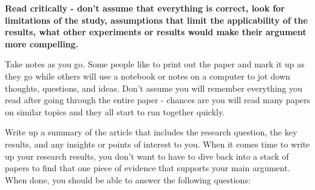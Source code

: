 \documentclass[12pt, letterpaper]{article}
\begin{document}
\textbf{Read critically - don't assume that everything is correct, look for limitations of the study, assumptions that limit the applicability of the results, what other experiments or results would make their argument more compelling.}

Take notes as you go.  Some people like to print out the paper and mark it up as they go while others will use a notebook or notes on a computer to jot down thoughts, questions, and ideas.  Don't assume you will remember everything you read after going through the entire paper - chances are you will read many papers on similar topics and they all start to run together quickly.

Write up a summary of the article that includes the research question, the key results, and any insights or points of interest to you.  When it comes time to write up your research results, you don't want to have to dive back into a stack of papers to find that one piece of evidence that supports your main argument.  When done, you should be able to answer the following questions:
\end{document}
